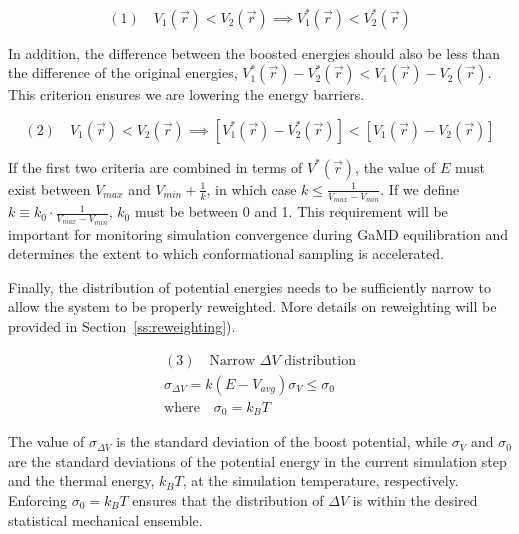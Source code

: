 \documentclass[9pt,tutorial]{livecoms}
\begin{document}
\begin{equation*}
    \boxed{(1)\quad V_{1}\left(\vec{r}\right) < V_{2}\left(\vec{r}\right) \implies V_{1}^{*}\left(\vec{r}\right) < V_{2}^{*}\left(\vec{r}\right)}
\end{equation*}

In addition, the difference between the boosted energies should also be less than the difference of the original energies, $V_{1}^{*}\left(\vec{r}\right) - V_{2}^{*}\left(\vec{r}\right) < V_{1}\left(\vec{r}\right) - V_{2}\left(\vec{r}\right)$. This criterion ensures we are lowering the energy barriers.

\begin{equation*}
    \boxed{(2)\quad V_{1}\left(\vec{r}\right) < V_{2}\left(\vec{r}\right) \implies \left[V_{1}^{*}\left(\vec{r}\right) - V_{2}^{*}\left(\vec{r}\right)\right] < \left[V_{1}\left(\vec{r}\right) - V_{2}\left(\vec{r}\right)\right]}
\end{equation*}

If the first two criteria are combined in terms of $V^{*}(\vec{r})$, the value of $E$ must exist between $V_{max}$ and $V_{min} + \frac{1}{k}$, in which case $k \leq \frac{1}{V_{max} - V_{min}}$. If we define $k \equiv k_{0} \cdot \frac{1}{V_{max} - V_{min}}$, $k_{0}$ must be between 0 and 1. This requirement will be important for monitoring simulation convergence during GaMD equilibration and determines the extent to which conformational sampling is accelerated. 

Finally, the distribution of potential energies needs to be sufficiently narrow to allow the system to be properly reweighted. More details on reweighting will be provided in Section~\ref{ss:reweighting}). 

\begin{equation*}
    \boxed{
    \begin{gathered}
        (3)\quad\text{Narrow $\Delta{V}$ distribution} \\
        \sigma_{\Delta{V}} = k(E-V_{avg})\sigma_{V} \leq \sigma_{0} \\
        \text{where} \quad \sigma_{0}= k_{B}T
    \end{gathered}
    }
\end{equation*}

The value of $\sigma_{\Delta{V}}$ is the standard deviation of the boost potential, while $\sigma_{V}$ and $\sigma_{0}$ are the standard deviations of the potential energy in the current simulation step and the thermal energy, $k_BT$, at the simulation temperature, respectively. Enforcing $\sigma_{0} = k_BT$ ensures that the distribution of $\Delta{V}$ is within the desired statistical mechanical ensemble.
\end{document}
